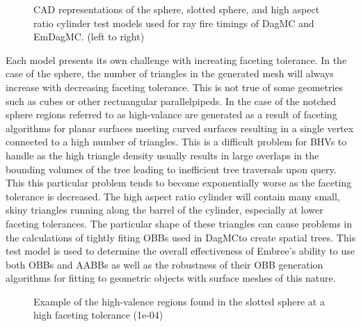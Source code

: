 \documentclass{anstrans}
\begin{document}
\begin{figure}

  \begin{center}

    \caption{CAD representations of the sphere, slotted sphere, and high aspect ratio cylinder test models used for ray fire timings of DagMC and EmDagMC. (left to right) }

  \end{center}

\end{figure}


Each model presents its own challenge with increating faceting tolerance. In the case of the sphere, the number of triangles in the generated mesh will always increase with decreasing faceting tolerance. This is not true of some geometries such as cubes or other rectuangular parallelpipeds. In the case of the notched sphere regions referred to as high-valance are generated as a result of faceting algorithms for planar surfaces meeting curved surfaces resulting in a single vertex connected to a high number of triangles. This is a difficult problem for BHVs to handle as the high triangle density usually results in large overlaps in the bounding volumes of the tree leading to inefficient tree traversals upon query. This this particular problem tends to become exponentially worse as the faceting tolerance is decreased. The high aspect ratio cylinder will contain many small, skiny triangles running along the barrel of the cylinder, especially at lower faceting tolerances. The particular shape of these triangles can cause problems in the calculations of tightly fiting OBBs used in DagMCto create spatial trees. This test model is used to determine the overall effectiveness of Embree's ability to use both OBBs and AABBs as well as the robustness of their OBB generation algorithms for fitting to geometric objects with surface meshes of this nature.

\begin{figure}

  \begin{center}

    \caption{Example of the high-valence regions found in the slotted sphere at a high faceting tolerance (1e-04)}

  \end{center}

\end{figure}
\end{document}
